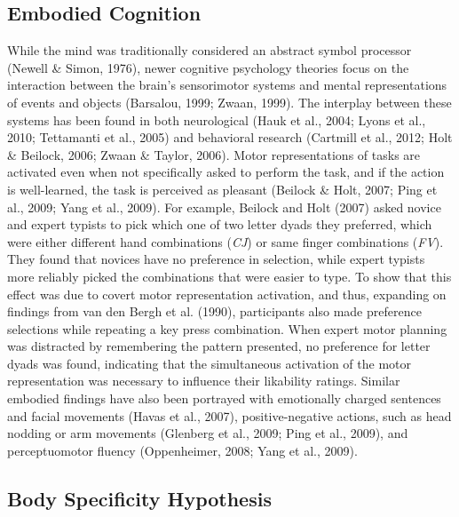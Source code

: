\documentclass[
  english,
  man,mask]{apa7}
\begin{document}
\hypertarget{embodied-cognition}{%
\subsection{Embodied Cognition}\label{embodied-cognition}}

While the mind was traditionally considered an abstract symbol processor (Newell \& Simon, 1976), newer cognitive psychology theories focus on the interaction between the brain's sensorimotor systems and mental representations of events and objects (Barsalou, 1999; Zwaan, 1999). The interplay between these systems has been found in both neurological (Hauk et al., 2004; Lyons et al., 2010; Tettamanti et al., 2005) and behavioral research (Cartmill et al., 2012; Holt \& Beilock, 2006; Zwaan \& Taylor, 2006). Motor representations of tasks are activated even when not specifically asked to perform the task, and if the action is well-learned, the task is perceived as pleasant (Beilock \& Holt, 2007; Ping et al., 2009; Yang et al., 2009). For example, Beilock and Holt (2007) asked novice and expert typists to pick which one of two letter dyads they preferred, which were either different hand combinations (\emph{CJ}) or same finger combinations (\emph{FV}). They found that novices have no preference in selection, while expert typists more reliably picked the combinations that were easier to type. To show that this effect was due to covert motor representation activation, and thus, expanding on findings from van den Bergh et al. (1990), participants also made preference selections while repeating a key press combination. When expert motor planning was distracted by remembering the pattern presented, no preference for letter dyads was found, indicating that the simultaneous activation of the motor representation was necessary to influence their likability ratings. Similar embodied findings have also been portrayed with emotionally charged sentences and facial movements (Havas et al., 2007), positive-negative actions, such as head nodding or arm movements (Glenberg et al., 2009; Ping et al., 2009), and perceptuomotor fluency (Oppenheimer, 2008; Yang et al., 2009).

\hypertarget{body-specificity-hypothesis}{%
\subsection{Body Specificity Hypothesis}\label{body-specificity-hypothesis}}
\end{document}
